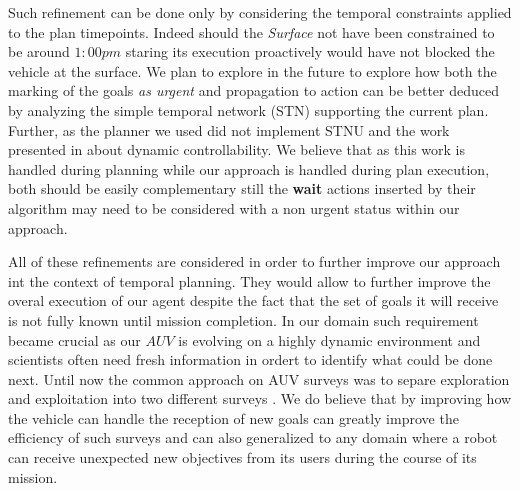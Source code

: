 Such refinement can be done only by considering the temporal
constraints applied to the plan timepoints. Indeed should the 
{\em Surface} not have been constrained to be around $1:00 pm$ staring
its execution proactively would have not blocked the vehicle at the
surface. We plan to explore in the future to explore how both the
marking of the goals {\em as urgent} and propagation to action  can be
better deduced by analyzing the simple temporal network (STN)
supporting the current plan. Further, as the planner we used did not
implement STNU and the work presented in \cite{morris01} about dynamic
controllability. We believe that as this work is handled during
planning while our approach is handled during plan execution, both
should be easily complementary still the {\bf wait} actions inserted
by their algorithm may need to be considered with a non
urgent status within our approach. 

All of these refinements are considered in order to further improve
our approach int the context of temporal planning. They would allow to
further improve the overal execution of our agent despite the fact
that the set of goals it will receive is not fully known until mission 
completion. In our domain such requirement became crucial as our $AUV$
is evolving on a highly dynamic environment and scientists often need
fresh information in ordert to identify what could be done next. Until
now the common approach on AUV surveys was to separe exploration and
exploitation into two different surveys \cite{Yoerger01012007}. We do
believe that by improving how the vehicle can handle the reception of
new goals can  greatly improve the efficiency of such surveys and can
also generalized to any domain where a robot can receive unexpected
new objectives from its users during the course  of its mission.







